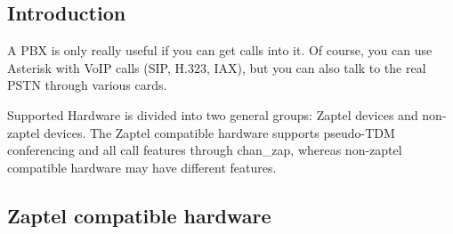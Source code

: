 \subsection{Introduction}

A PBX is only really useful if you can get calls into it.  Of course, you
can use Asterisk with VoIP calls (SIP, H.323, IAX), but you can also talk
to the real PSTN through various cards.

Supported Hardware is divided into two general groups:  Zaptel devices and 
non-zaptel devices.  The Zaptel compatible hardware supports pseudo-TDM 
conferencing and all call features through chan\_zap, whereas non-zaptel 
compatible hardware may have different features.

\subsection{Zaptel compatible hardware}

